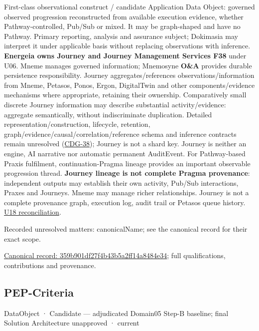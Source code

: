 First-class observational construct / candidate Application Data Object: governed
observed progression reconstructed from available execution evidence, whether
Pathway-controlled, Pub/Sub or mixed. It may be graph-shaped and have no Pathway.
Primary reporting, analysis and assurance subject; Dokimasia may
interpret it under applicable basis without replacing observations with inference.
\textbf{Energeia owns Journey and Journey Management Services F38} under U06. Mneme
manages governed information; Mnemosyne \textbf{O\&A} provides durable persistence
responsibility. Journey aggregates/references observations/information from Mneme,
Petasos, Ponos, Ergon, DigitalTwin and other components/evidence mechanisms where
appropriate, retaining their ownership. Comparatively small discrete Journey
information may describe substantial activity/evidence: aggregate semantically,
without indiscriminate duplication. Detailed representation/construction, lifecycle,
retention, graph/evidence/causal/correlation/reference schema and inference contracts
remain unresolved (\href{\detokenize{../../../../../docs/markdown/05-information-systems-architecture/gaps.md#journey-contracts}}{CDG-38}); Journey is not a shard key.
Journey is neither an engine, AI narrative nor automatic permanent AuditEvent.
For Pathway-based Praxis fulfilment, continuation-Pragma lineage provides an
important observable progression thread. \textbf{Journey lineage is not complete
Pragma provenance}: independent outputs may establish their own activity,
Pub/Sub interactions, Praxes and Journeys. Mneme may manage richer relationships.
Journey is not a complete provenance graph, execution log, audit trail or Petasos
queue history. \hyperref[element:359b901df27f4b43b5a2ff14a8484e34]{U18 reconciliation}.


{\small Recorded unresolved matters: canonicalName; see the canonical record for their exact scope.}\par
{\footnotesize \href{../../../../continuum/application/data-object/359b901df27f4b43b5a2ff14a8484e34.md}{Canonical record: 359b901df27f4b43b5a2ff14a8484e34}; full qualifications, contributions and provenance.}\par
\subsection{PEP-Criteria}

\label{element:7e10287b7e634bce8aa2481eb481bb76}
{\small DataObject · Candidate — adjudicated Domain05 Step-B baseline; final Solution Architecture unapproved · current}\par


